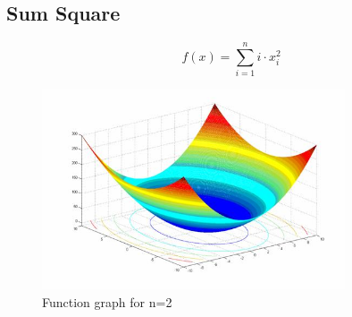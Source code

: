 \documentclass{article}
\begin{document}
\clearpage
\subsection{Sum Square}

{\Large %
\[
f(x) = \sum_{i=1}^{n} i \cdot x_i^2                 
\]

\begin{figure}[h!]
    \centering
    \includegraphics[width=0.8\textwidth]{sum_square.jpg} 
    \caption{Function graph for n=2 \cite{Sum_Square}}
    \label{fig:rastrigin-image}
\end{figure}

}
\end{document}
